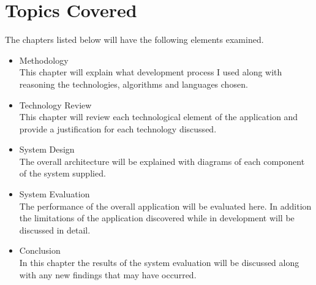 \section{Topics Covered}
The chapters listed below will have the following elements examined.
\begin{itemize}
	\item Methodology\\
	This chapter will explain what development process I used along with reasoning the technologies, algorithms and languages chosen.
	\item Technology Review\\
	This chapter will review each technological element of the application and provide a justification for each technology discussed.
	\item System Design\\
	The overall architecture will be explained with diagrams of each component of the system supplied.
	\item System Evaluation\\
	The performance of the overall application will be evaluated here. In addition the limitations of the application discovered while in development will be discussed in detail.
	\item Conclusion\\
	In this chapter the results of the system evaluation will be discussed along with any new findings that may have occurred.
\end{itemize}
